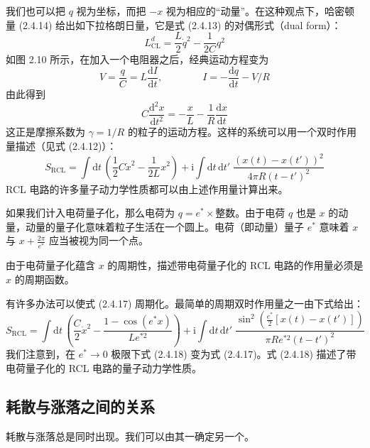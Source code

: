 我们也可以把 $q$ 视为坐标，而把 $-x$ 视为相应的“动量”。在这种观点下，哈密顿量 (2.4.14) 给出如下拉格朗日量，它是式 (2.4.13) 的对偶形式（dual form）：
\begin{equation*}
L_{\mathrm{CL}}^d = \frac{L}{2}\dot{q}^2 - \frac{1}{2C}q^2 \tag{2.4.15}
\end{equation*}
如图 2.10 所示，在加入一个电阻器之后，经典运动方程变为
\begin{equation*}
V = \frac{q}{C} = L\frac{\mathrm{d}I}{\mathrm{d}t}, \qquad\qquad I = -\frac{\mathrm{d}q}{\mathrm{d}t} - V/R
\end{equation*}
由此得到
\begin{equation*}
C\frac{\mathrm{d}^2x}{\mathrm{d}t^2} = -\frac{x}{L} - \frac{1}{R}\frac{\mathrm{d}x}{\mathrm{d}t} \tag{2.4.16}
\end{equation*}
这正是摩擦系数为 $\gamma = 1/R$ 的粒子的运动方程。这样的系统可以用一个双时作用量描述（见式 (2.4.12)）：
\begin{equation*}
S_{\mathrm{RCL}} = \int \mathrm{d}t\,\left(\frac{1}{2}C\dot{x}^2 - \frac{1}{2L}x^2\right) + \mathrm{i}\int \mathrm{d}t\,\mathrm{d}t'\;\frac{(x(t) - x(t'))^2}{4\pi R(t - t')^2} \tag{2.4.17}
\end{equation*}
RCL 电路的许多量子动力学性质都可以由上述作用量计算出来。

如果我们计入电荷量子化，那么电荷为 $q = e^{*} \times \text{整数}$。由于电荷 $q$ 也是 $x$ 的动量，动量的量子化意味着粒子生活在一个圆上。电荷（即动量）量子 $e^{*}$ 意味着 $x$ 与 $x + \frac{2\pi}{e^{*}}$ 应当被视为同一个点。

由于电荷量子化蕴含 $x$ 的周期性，描述带电荷量子化的 RCL 电路的作用量必须是 $x$ 的周期函数。

有许多办法可以使式 (2.4.17) 周期化。最简单的周期双时作用量之一由下式给出：
\begin{equation*}
S_{\mathrm{RCL}} = \int \mathrm{d}t\,\left(\frac{C}{2}\dot{x}^2 - \frac{1 - \cos(e^{*}x)}{Le^{*2}}\right) + \mathrm{i}\int \mathrm{d}t\,\mathrm{d}t'\;\frac{\sin^2\!\left(\frac{e^{*}}{2}[x(t) - x(t')]\right)}{\pi R e^{*2}(t - t')^2} \tag{2.4.18}
\end{equation*}
我们注意到，在 $e^{*} \to 0$ 极限下式 (2.4.18) 变为式 (2.4.17)。式 (2.4.18) 描述了带电荷量子化的 RCL 电路的量子动力学性质。

\subsection{耗散与涨落之间的关系}

\begin{keypoints}
\item 耗散与涨落总是同时出现。我们可以由其一确定另一个。
\end{keypoints}

